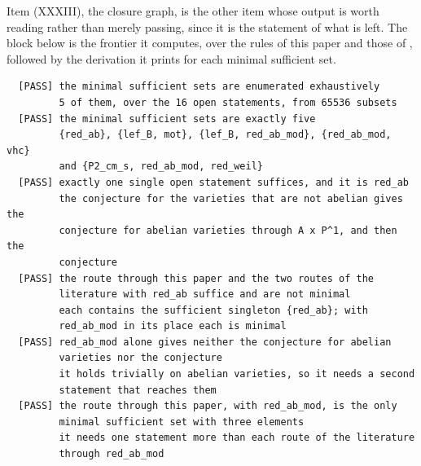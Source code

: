 Item (XXXIII), the closure graph, is the other item whose output is worth
reading rather than merely passing, since it is the statement of what is left.
The block below is the frontier it computes, over the rules of this paper and
those of , followed by the derivation it prints for each
minimal sufficient set.

\begin{small}
\begin{verbatim}
  [PASS] the minimal sufficient sets are enumerated exhaustively
         5 of them, over the 16 open statements, from 65536 subsets
  [PASS] the minimal sufficient sets are exactly five
         {red_ab}, {lef_B, mot}, {lef_B, red_ab_mod}, {red_ab_mod, vhc}
         and {P2_cm_s, red_ab_mod, red_weil}
  [PASS] exactly one single open statement suffices, and it is red_ab
         the conjecture for the varieties that are not abelian gives the
         conjecture for abelian varieties through A x P^1, and then the
         conjecture
  [PASS] the route through this paper and the two routes of the
         literature with red_ab suffice and are not minimal
         each contains the sufficient singleton {red_ab}; with
         red_ab_mod in its place each is minimal
  [PASS] red_ab_mod alone gives neither the conjecture for abelian
         varieties nor the conjecture
         it holds trivially on abelian varieties, so it needs a second
         statement that reaches them
  [PASS] the route through this paper, with red_ab_mod, is the only
         minimal sufficient set with three elements
         it needs one statement more than each route of the literature
         through red_ab_mod


\end{verbatim}
\end{small}
